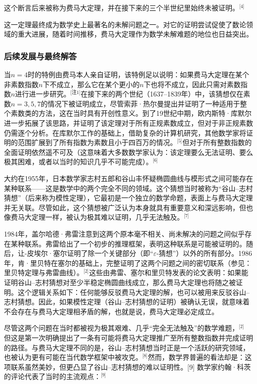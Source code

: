 这个断言后来被称为费马大定理，并在接下来的三个半世纪里始终未被证明。\(^\text{[4]}\)

这一定理最终成为数学史上最著名的未解问题之一。对它的证明尝试促使了数论领域的重大进展，随着时间推移，费马大定理作为数学未解难题的地位也日益突出。
\subsubsection{后续发展与最终解答}
当\(n = 4\)时的特例由费马本人亲自证明，该特例足以说明：如果费马大定理在某个非素数指数\(n\)下不成立，那么它在某个更小的\(n\)下也将不成立，因此只需对素数指数\(n\)进行进一步研究。\(^\text{[注1]}\)在接下来的两个世纪（1637–1839年）中，该猜想仅在素数\(n = 3, 5, 7\)的情况下被证明成立，尽管索菲·热尔曼提出并证明了一种适用于整个素数类的方法，这在当时具有开创性意义。到了19世纪中期，欧内斯特·库默尔进一步拓展了该思路，并证明了该定理对于所有正规素数成立，但对于非正规素数仍需逐个分析。在库默尔工作的基础上，借助复杂的计算机研究，其他数学家将证明的范围扩展到了所有指数为素数且小于四百万的情况。\(^\text{[5]}\)但对于所有整数指数的全面证明依然遥不可及（这意味着大多数数学家认为：该定理要么无法证明、要么极其困难，或者以当时的知识几乎不可能完成）。\(^\text{[6]}\)

大约在1955年，日本数学家志村五郎和谷山丰怀疑椭圆曲线与模形式之间可能存在某种联系——这是数学中的两个完全不同的领域。这个猜想当时被称为“谷山–志村猜想”（后来称为模性定理），它最初是一个独立的数学命题，表面上与费马大定理并无关联。尽管如此，这个猜想被广泛认为本身就具有重要意义和深远影响，但也像费马大定理一样，被认为极其难以证明，几乎无法触及。\(^\text{[7]}\)

1984年，盖尔哈德·弗雷注意到这两个原本毫不相关、尚未解决的问题之间似乎存在某种联系。弗雷给出了一个初步的推理框架，表明这种联系是可能被证明的。随后，让-皮埃尔·塞尔证明了除一个关键部分（即“\(\varepsilon\)-猜想”）以外的所有部分。1986年，肯·里贝特在塞尔的基础上，完整证明了这两个问题之间的密切联系（参见：里贝特定理与弗雷曲线）。\(^\text{[2]}\)这些由弗雷、塞尔和里贝特发表的论文表明：如果能证明谷山–志村猜想对至少半稳定椭圆曲线成立，那么费马大定理也将随之被证明。这个逻辑关系如下：任何能够反驳费马大定理的解，也可以被用来反驳谷山–志村猜想。因此，如果模性定理（谷山–志村猜想的证明）被确认无误，就意味着不会存在与费马大定理相矛盾的解，也就是说，费马大定理必定成立。

尽管这两个问题在当时都被视为极其艰难、几乎“完全无法触及”的数学难题，\(^\text{[2]}\) 但这是第一次明确提出了一条有可能将费马大定理推广至所有整数指数并完成证明的路径。与费马大定理不同的是，谷山–志村猜想当时正是一个活跃的研究领域，也被认为更有可能在当代数学框架中被攻克。\(^\text{[8]}\)然而，数学界普遍的看法却是：这项联系虽然美妙，但更凸显了谷山–志村猜想的难以证明性。[9] 数学家约翰·科茨的评论代表了当时的主流观点：\(^\text{[9]}\)

